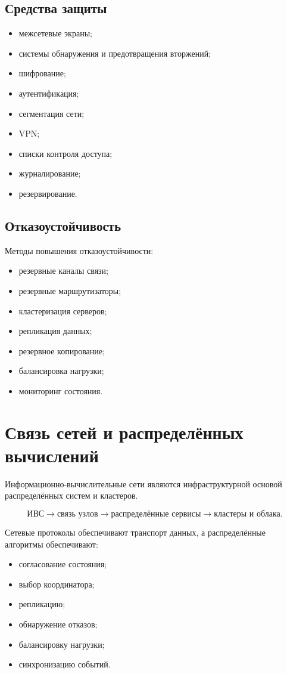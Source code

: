\documentclass[12pt,a4paper]{article}
\begin{document}
\subsection{Средства защиты}

\begin{itemize}
    \item межсетевые экраны;
    \item системы обнаружения и предотвращения вторжений;
    \item шифрование;
    \item аутентификация;
    \item сегментация сети;
    \item VPN;
    \item списки контроля доступа;
    \item журналирование;
    \item резервирование.
\end{itemize}

\subsection{Отказоустойчивость}

Методы повышения отказоустойчивости:
\begin{itemize}
    \item резервные каналы связи;
    \item резервные маршрутизаторы;
    \item кластеризация серверов;
    \item репликация данных;
    \item резервное копирование;
    \item балансировка нагрузки;
    \item мониторинг состояния.
\end{itemize}

\section{Связь сетей и распределённых вычислений}

Информационно-вычислительные сети являются инфраструктурной основой распределённых систем и кластеров.

\[
\text{ИВС}
\rightarrow
\text{связь узлов}
\rightarrow
\text{распределённые сервисы}
\rightarrow
\text{кластеры и облака}.
\]

Сетевые протоколы обеспечивают транспорт данных, а распределённые алгоритмы обеспечивают:
\begin{itemize}
    \item согласование состояния;
    \item выбор координатора;
    \item репликацию;
    \item обнаружение отказов;
    \item балансировку нагрузки;
    \item синхронизацию событий.
\end{itemize}
\end{document}
